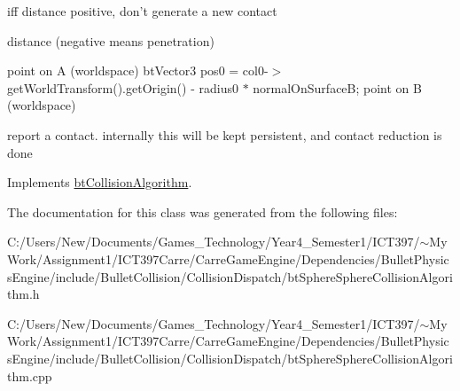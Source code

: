 iff distance positive, don't generate a new contact

distance (negative means penetration)

point on A (worldspace) btVector3 pos0 = col0-$>$getWorldTransform().getOrigin() - radius0 $\ast$ normalOnSurfaceB; point on B (worldspace)

report a contact. internally this will be kept persistent, and contact reduction is done 

Implements \hyperlink{classbt_collision_algorithm}{btCollisionAlgorithm}.

The documentation for this class was generated from the following files:\begin{CompactItemize}
\item 
C:/Users/New/Documents/Games\_\-Technology/Year4\_\-Semester1/ICT397/$\sim$My Work/Assignment1/ICT397Carre/CarreGameEngine/Dependencies/BulletPhysicsEngine/include/BulletCollision/CollisionDispatch/btSphereSphereCollisionAlgorithm.h\item 
C:/Users/New/Documents/Games\_\-Technology/Year4\_\-Semester1/ICT397/$\sim$My Work/Assignment1/ICT397Carre/CarreGameEngine/Dependencies/BulletPhysicsEngine/include/BulletCollision/CollisionDispatch/btSphereSphereCollisionAlgorithm.cpp\end{CompactItemize}
